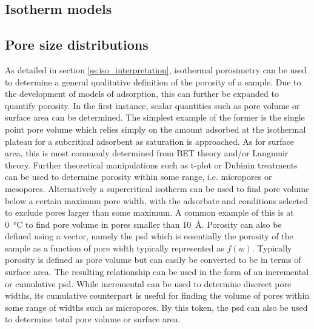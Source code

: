 \subsection{Isotherm models}

\subsection{Pore size distributions}

As detailed in section \ref{ss:iso_interpretation}, isothermal porosimetry can be used to determine a general qualitative definition of the porosity of a sample. Due to the development of models of adsorption, this can further be expanded to quantify porosity. In the first instance, scalar quantities such as pore volume or surface area can be determined.\citep{Thommes2015Physisorption} The simplest example of the former is the single point pore volume which relies simply on the amount adsorbed at the isothermal plateau for a subcritical \gls{adsorbent} as saturation is approached. As for surface area, this is most commonly determined from BET theory and/or Langmuir theory.\citep{Brunauer1938Adsorption, Langmuir1918adsorption} Further theoretical manipulations such as t-plot or Dubinin treatments can be used to determine porosity within some range, i.e. \glspl{micropore} or \glspl{mesopore}.\citep{Dubinin1971Description, Marczewski2002practical} Alternatively a supercritical isotherm can be used to find pore volume below a certain maximum pore width, with the adsorbate and conditions selected to exclude pores larger than some maximum. A common example of this is  at \qty{0}{\degreeCelsius} to find pore volume in pores smaller than \qty{10}{\angstrom}.\citep{Jagiello2019Enhanced, Sevilla2013Assessment, Thommes2015Physisorption} Porosity can also be defined using a vector, namely the \acrfull{psd} which is essentially the porosity of the sample as a function of pore width typically represented as $f(w)$. Typically porosity is defined as pore volume but can easily be converted to be in terms of surface area. The resulting relationship can be used in the form of an incremental or cumulative \acrshort{psd}. While incremental  can be used to determine discreet pore widths, its cumulative counterpart is useful for finding the volume of pores within some range of widths such as \glspl{micropore}. By this token, the \acrshort{psd} can also be used to determine total pore volume or surface area.\citep{Thommes2015Physisorption, shull1948physical, Barrett1951determination}

